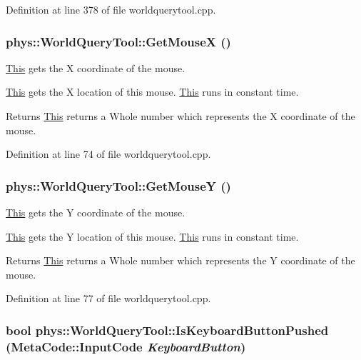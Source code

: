Definition at line 378 of file worldquerytool.cpp.

\hypertarget{classphys_1_1WorldQueryTool_a55721f152fb117fdfb8bc6d20af6b1dc}{
\subsubsection[{GetMouseX}]{ phys::WorldQueryTool::GetMouseX ()}}
\label{d8/d69/classphys_1_1WorldQueryTool_a55721f152fb117fdfb8bc6d20af6b1dc}


\hyperlink{structThis}{This} gets the X coordinate of the mouse. 

\hyperlink{structThis}{This} gets the X location of this mouse. \hyperlink{structThis}{This} runs in constant time. \begin{DoxyReturn}{Returns}
\hyperlink{structThis}{This} returns a Whole number which represents the X coordinate of the mouse. 
\end{DoxyReturn}


Definition at line 74 of file worldquerytool.cpp.

\hypertarget{classphys_1_1WorldQueryTool_ac2d8517db7305157c1393320f434751b}{
\subsubsection[{GetMouseY}]{ phys::WorldQueryTool::GetMouseY ()}}
\label{d8/d69/classphys_1_1WorldQueryTool_ac2d8517db7305157c1393320f434751b}


\hyperlink{structThis}{This} gets the Y coordinate of the mouse. 

\hyperlink{structThis}{This} gets the Y location of this mouse. \hyperlink{structThis}{This} runs in constant time. \begin{DoxyReturn}{Returns}
\hyperlink{structThis}{This} returns a Whole number which represents the Y coordinate of the mouse. 
\end{DoxyReturn}


Definition at line 77 of file worldquerytool.cpp.

\hypertarget{classphys_1_1WorldQueryTool_a8343f54b900adb316ddc6de5405da328}{
\subsubsection[{IsKeyboardButtonPushed}]{\setlength{\rightskip}{0pt plus 5cm}bool phys::WorldQueryTool::IsKeyboardButtonPushed ({\bf MetaCode::InputCode} {\em KeyboardButton})}}
\label{d8/d69/classphys_1_1WorldQueryTool_a8343f54b900adb316ddc6de5405da328}


